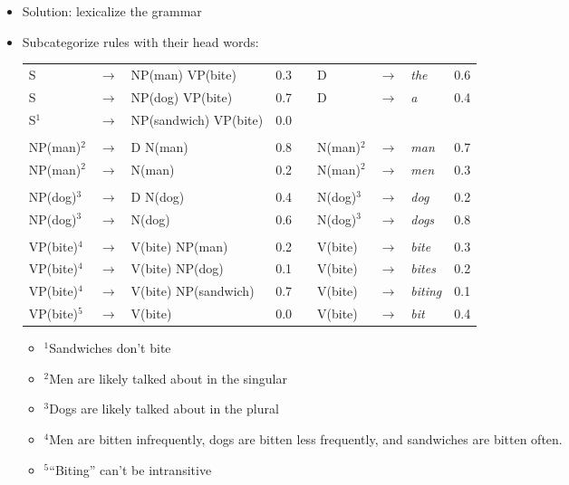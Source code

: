 \documentclass[11pt,letterpaper]{article}
\newcommand{\ra}{\rightarrow}
\begin{document}
\begin{itemize}
\begin{small}
    \end{small}
  \item Solution: lexicalize the grammar
  \item Subcategorize rules with their head words:
	\begin{center}
	\begin{tabular}{llll p{18mm} llll}
	  S  & $\ra$ & NP(man) VP(bite)            &  0.3  &&  D & $\ra$ & \textit{the}        & 0.6 \\
	  S  & $\ra$ & NP(dog) VP(bite)            &  0.7  &&  D & $\ra$ & \textit{a}          & 0.4 \\
	  S$^1$  & $\ra$ & NP(sandwich) VP(bite)       &  0.0  &&    &       &                     &     \\
	     &       &                             &       &&    &       &                     &     \\
	  NP(man)$^2$ & $\ra$ & D N(man)               &  0.8  &&  N(man)$^2$ & $\ra$ & \textit{man}   & 0.7 \\
	  NP(man)$^2$ & $\ra$ & N(man)                 &  0.2  &&  N(man)$^2$ & $\ra$ & \textit{men}   & 0.3 \\
	     &       &                             &       &&    &       &                     &     \\
	  NP(dog)$^3$ & $\ra$ & D N(dog)               &  0.4  &&  N(dog)$^3$ & $\ra$ & \textit{dog}   & 0.2 \\
	  NP(dog)$^3$ & $\ra$ & N(dog)                 &  0.6  &&  N(dog)$^3$ & $\ra$ & \textit{dogs}  & 0.8 \\
	     &       &                             &       &&    &       &                     &     \\
	  VP(bite)$^4$ & $\ra$ & V(bite) NP(man)       &  0.2  &&  V(bite) & $\ra$ & \textit{bite}    & 0.3 \\
	  VP(bite)$^4$ & $\ra$ & V(bite) NP(dog)       &  0.1  &&  V(bite) & $\ra$ & \textit{bites}   & 0.2 \\
	  VP(bite)$^4$ & $\ra$ & V(bite) NP(sandwich)  &  0.7  &&  V(bite) & $\ra$ & \textit{biting}  & 0.1 \\
	  VP(bite)$^5$ & $\ra$ & V(bite)               &  0.0  &&  V(bite) & $\ra$ & \textit{bit}     & 0.4 \\
	\end{tabular}
	\end{center}
  \begin{itemize}
    \item {}$^1$Sandwiches don't bite
    \item {}$^2$Men are likely talked about in the singular
    \item {}$^3$Dogs are likely talked about in the plural
    \item {}$^4$Men are bitten infrequently, dogs are bitten less frequently, and sandwiches are bitten often.
    \item {}$^5$``Biting'' can't be intransitive
  \end{itemize}


\end{itemize}
\end{document}
